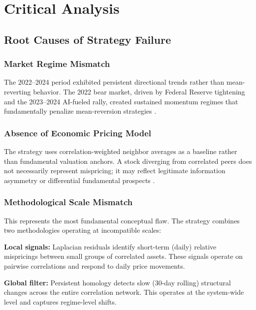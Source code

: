 \section{Critical Analysis}
\label{sec:analysis}

\subsection{Root Causes of Strategy Failure}

\subsubsection{Market Regime Mismatch}

The 2022--2024 period exhibited persistent directional trends rather than mean-reverting behavior. The 2022 bear market, driven by Federal Reserve tightening and the 2023--2024 AI-fueled rally, created sustained momentum regimes that fundamentally penalize mean-reversion strategies \citep{Moskowitz2012}.

\subsubsection{Absence of Economic Pricing Model}

The strategy uses correlation-weighted neighbor averages as a baseline rather than fundamental valuation anchors. A stock diverging from correlated peers does not necessarily represent mispricing; it may reflect legitimate information asymmetry or differential fundamental prospects \citep{FamaFrench2015}.

\subsubsection{Methodological Scale Mismatch}

This represents the most fundamental conceptual flaw. The strategy combines two methodologies operating at incompatible scales:

\textbf{Local signals:} Laplacian residuals identify short-term (daily) relative mispricings between small groups of correlated assets. These signals operate on pairwise correlations and respond to daily price movements.

\textbf{Global filter:} Persistent homology detects slow (30-day rolling) structural changes across the entire correlation network. This operates at the system-wide level and captures regime-level shifts.

